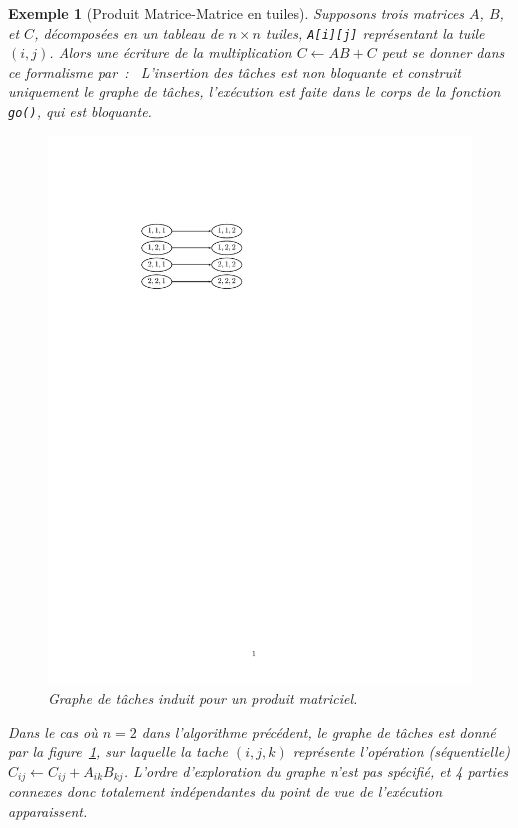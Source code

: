 \documentclass[11pt]{article}
\theoremstyle{plain} %
\newtheorem{example}[thm]{Exemple}
\theoremstyle{definition} %
\begin{document}
\begin{example}[Produit Matrice-Matrice en tuiles]
  \label{ex:gemm-tile}
  Supposons trois matrices $A$, $B$, et $C$, décomposées en un tableau de $n \times n$ tuiles, \texttt{A[i][j]} représentant la tuile $(i, j)$.
  Alors une écriture de la multiplication $C \gets AB + C$ peut se donner dans ce formalisme par~:~
L'insertion des tâches est non bloquante et construit uniquement le graphe de tâches, l'exécution est faite dans le corps de la fonction \texttt{go()}, qui est bloquante.

\begin{figure}[htpb]
  \centering
  \includegraphics{figures/dag_gemm_22.pdf}
  \caption{Graphe de tâches induit pour un produit matriciel.}
  \label{fig:dag-gemm-22}
\end{figure}

Dans le cas où $n = 2$ dans l'algorithme précédent, le graphe de tâches est donné par la figure~\ref{fig:dag-gemm-22}, sur laquelle la tache $(i, j, k)$ représente l'opération (séquentielle) $C_{ij} \gets C_{ij} + A_{ik} B_{kj}$.
L'ordre d'exploration du graphe n'est pas spécifié, et 4 parties connexes donc totalement indépendantes du point de vue de l'exécution apparaissent.
\end{example}
\end{document}
